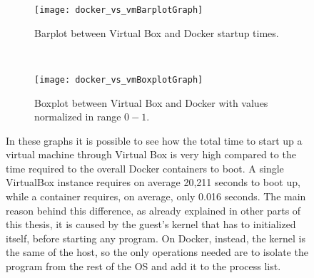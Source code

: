 \begin{figure}[H]
    \centering
    \begin{subfigure}[b]{0.4\textwidth}
        \texttt{[image: docker\_vs\_vmBarplotGraph]}
        \caption{Barplot between Virtual Box and Docker startup times.}
        \label{chap:tests:sec:dockervsvb:img:barplot}
    \end{subfigure}
    ~
    \begin{subfigure}[b]{0.4\textwidth}
        \texttt{[image: docker\_vs\_vmBoxplotGraph]}
        \caption{Boxplot between Virtual Box and Docker with values normalized 
in range $0-1$.}
        \label{chap:tests:sec:dockervsvb:img:boxplot}
    \end{subfigure}
    \caption[Virtual Box vs Docker start up comparison]{In these graphs it is
      possible to see how the total time to start up a virtual machine through
      Virtual Box is very high compared to the time required to the overall
      Docker containers to boot. A single VirtualBox instance requires on
      average 20,211 seconds to boot up, while a container requires, on average,
      only 0.016 seconds. The main reason behind this difference, as already
      explained in other parts of this thesis, it is caused by the guest's
      kernel that has to initialized itself, before starting any program. On
      Docker, instead, the kernel is the same of the host, so the only
      operations needed are to isolate the program from the rest of the OS and
      add it to the process list.}
    \label{chap:tests:sec:dockervsvb:subimg:plots}
\end{figure}


\begin{table}[t]
\centering
{}
\caption[Docker vs Virtual Box start up times comparison]{Docker vs Virtual Box
  start up times comparison. Is possible to se how the overall time required to
  start $100$ containers is less than the time to start one traditional virtual
  machine. The overall time required by the traitional virtualization system is
  approximately of 33 minutes, witch gives a significant insight of how much
  time is required to create and boot a virtualized enviroment.}
\label{my-label}
\end{table}


